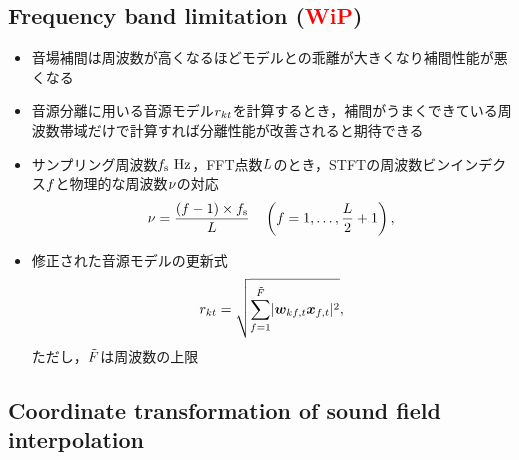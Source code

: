 \documentclass[sip,biber]{now-journal}
\begin{document}


\subsection{Frequency band limitation (\textcolor{red}{\textbf{WiP}})}
\begin{itemize}
  \item 音場補間は周波数が高くなるほどモデルとの乖離が大きくなり補間性能が悪くなる \cite{Wakabayashi:2020:ASJ:A}
  \item 音源分離に用いる音源モデル$r _{kt}$を計算するとき，補間がうまくできている周波数帯域だけで計算すれば分離性能が改善されると期待できる
  \item サンプリング周波数$\freqSamp~\unit{\hertz}$，FFT点数$L$のとき，STFTの周波数ビンインデクス$f$と物理的な周波数$\nu$の対応
    \begin{equation}
      \nu = \frac{(f - 1)\times f _{\mathrm{s}}}{L} \quad \left(f = 1, \dots, \frac{L}{2} + 1\right),
    \end{equation}
  \item 修正された音源モデルの更新式
    \begin{equation}
      \var _{\src\tframe} = \sqrt{\sum _{\freq = 1} ^{\SubFreq} \lvert \demix _{\src\ft} \Obs _{\ft} \rvert ^2},
    \end{equation}
    ただし，$\tilde{F}$は周波数の上限
\end{itemize}

\subsection{Coordinate transformation of sound field interpolation}
\end{document}

